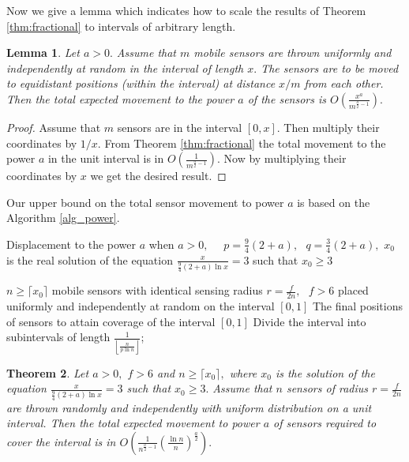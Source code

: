 \documentclass[final,5p,times,twocolumn]{elsarticle_mod}
\newtheorem{theorem}{Theorem}
\newtheorem{Lemma}[theorem]{Lemma}
\begin{document}
Now we give a lemma which indicates how to scale the results of Theorem \ref{thm:fractional}
to intervals of arbitrary length.
\begin{Lemma}
\label{lem:scale}
Let $a>0.$ Assume that $m$ mobile sensors are thrown uniformly and independently at random in the interval of length $x.$ The sensors are to be moved to
equidistant positions (within the interval) at distance $x/m$ from each other. Then the total expected movement to the power $a$ of the sensors
is $O\left(\frac{x^{a}}{m^{\frac{a}{2}-1}}\right).$
\end{Lemma}
\begin{proof}
Assume that $m$ sensors are in the interval $[0,x].$ Then multiply their coordinates by $1/x.$ From Theorem \ref{thm:fractional} 
the total movement to the power $a$ in the unit interval is in $O\left(\frac{1}{m^{\frac{a}{2}-1}}\right).$ Now by multiplying their coordinates by $x$
we get the desired result. 
\end{proof}
Our upper bound on the total sensor movement to power $a$ is based on the Algorithm \ref{alg_power}.
\begin{algorithm}
\caption{Displacement to the power $a$ when $a>0,$ \,\,\,\, $p=\frac{9}{4}(2+a),\,\,$ $q=\frac{3}{4}(2+a),$
$x_0$ is the real solution of the equation $\frac{x}{\frac{9}{4}(2+a)\ln x}=3$ such that $x_0\ge 3$
}
\label{alg_power}
\begin{algorithmic}[1]
 \REQUIRE $n\ge \lceil x_0 \rceil$ mobile sensors with identical sensing radius $r=\frac{f}{2n},\,\,$ $f>6$ placed uniformly and independently at random on the interval $[0,1]$
 \ENSURE  The final positions of sensors to attain coverage of the interval $[0,1]$
\STATE Divide the interval into subintervals of length $\frac{1}{\left\lfloor\frac{n}{p\ln n}\right\rfloor}$;
   \ELSE 
   \ENDIF
\end{algorithmic}
\end{algorithm}
\begin{theorem}
\label{thm:alg}
Let $a>0,$ $f>6$ and $n\ge \lceil x_0 \rceil,$ where $x_0$
is the solution of the equation $\frac{x}{\frac{9}{4}(2+a)\ln x}=3$ such that $x_0\ge 3.$
Assume that $n$ sensors of radius $r=\frac{f}{2n}$ are thrown randomly and independently
with uniform distribution on a unit interval. 
Then the total expected movement to power $a$ of sensors required to cover the interval is in
$O\left(\frac{1}{n^{\frac{a}{2}-1}}(\frac{\ln n}{n})^{\frac{a}{2}}\right).$
\end{theorem} 
\end{document}
